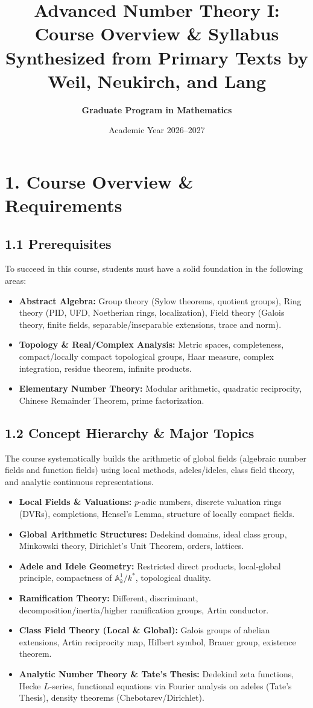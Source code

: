 \documentclass[11pt,a4paper]{article}
\title{\textbf{Advanced Number Theory I: Course Overview \& Syllabus}\\\large Synthesized from Primary Texts by Weil, Neukirch, and Lang}
\author{\textbf{Graduate Program in Mathematics}}
\date{Academic Year 2026--2027}
\begin{document}
\maketitle

\section*{1. Course Overview \& Requirements}

\subsection*{1.1 Prerequisites}
To succeed in this course, students must have a solid foundation in the following areas:
\begin{itemize}[leftmargin=*]
    \item \textbf{Abstract Algebra:} Group theory (Sylow theorems, quotient groups), Ring theory (PID, UFD, Noetherian rings, localization), Field theory (Galois theory, finite fields, separable/inseparable extensions, trace and norm).
    \item \textbf{Topology \& Real/Complex Analysis:} Metric spaces, completeness, compact/locally compact topological groups, Haar measure, complex integration, residue theorem, infinite products.
    \item \textbf{Elementary Number Theory:} Modular arithmetic, quadratic reciprocity, Chinese Remainder Theorem, prime factorization.
\end{itemize}

\subsection*{1.2 Concept Hierarchy \& Major Topics}
The course systematically builds the arithmetic of global fields (algebraic number fields and function fields) using local methods, adeles/ideles, class field theory, and analytic continuous representations.
\begin{itemize}[leftmargin=*]
    \item \textbf{Local Fields \& Valuations:} $p$-adic numbers, discrete valuation rings (DVRs), completions, Hensel's Lemma, structure of locally compact fields.
    \item \textbf{Global Arithmetic Structures:} Dedekind domains, ideal class group, Minkowski theory, Dirichlet's Unit Theorem, orders, lattices.
    \item \textbf{Adele and Idele Geometry:} Restricted direct products, local-global principle, compactness of $\mathbb{A}_k^1 / k^*$, topological duality.
    \item \textbf{Ramification Theory:} Different, discriminant, decomposition/inertia/higher ramification groups, Artin conductor.
    \item \textbf{Class Field Theory (Local \& Global):} Galois groups of abelian extensions, Artin reciprocity map, Hilbert symbol, Brauer group, existence theorem.
    \item \textbf{Analytic Number Theory \& Tate's Thesis:} Dedekind zeta functions, Hecke $L$-series, functional equations via Fourier analysis on adeles (Tate's Thesis), density theorems (Chebotarev/Dirichlet).
\end{itemize}
\end{document}
